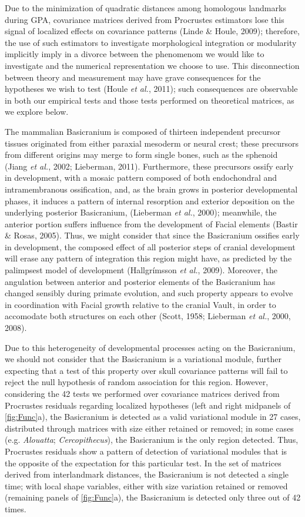 \documentclass[12pt,twoside]{report}
\begin{document}
Due to the minimization of quadratic distances among homologous
landmarks during GPA, covariance matrices derived from Procrustes
estimators lose this signal of localized effects on covariance patterns
(Linde \& Houle, 2009); therefore, the use of such estimators to
investigate morphological integration or modularity implicitly imply in
a divorce between the phenomenom we would like to investigate and the
numerical representation we choose to use. This disconnection between
theory and measurement may have grave consequences for the hypotheses we
wish to test (Houle \emph{et al.}, 2011); such consequences are
observable in both our empirical tests and those tests performed on
theoretical matrices, as we explore below.

The mammalian Basicranium is composed of thirteen independent precursor
tissues originated from either paraxial mesoderm or neural crest; these
precursors from different origins may merge to form single bones, such
as the sphenoid (Jiang \emph{et al.}, 2002; Lieberman, 2011).
Furthermore, these precursors ossify early in development, with a mosaic
pattern composed of both endochondral and intramembranous ossification,
and, as the brain grows in posterior developmental phases, it induces a
pattern of internal resorption and exterior deposition on the underlying
posterior Basicranium, (Lieberman \emph{et al.}, 2000); meanwhile, the
anterior portion suffers influence from the development of Facial
elements (Bastir \& Rosas, 2005). Thus, we might consider that since the
Basicranium ossifies early in development, the composed effect of all
posterior steps of cranial development will erase any pattern of
integration this region might have, as predicted by the palimpsest model
of development (Hallgrímsson \emph{et al.}, 2009). Moreover, the
angulation between anterior and posterior elements of the Basicranium
has changed sensibly during primate evolution, and such property appears
to evolve in coordination with Facial growth relative to the cranial
Vault, in order to accomodate both structures on each other (Scott,
1958; Lieberman \emph{et al.}, 2000, 2008).

Due to this heterogeneity of developmental processes acting on the
Basicranium, we should not consider that the Basicranium is a
variational module, further expecting that a test of this property over
skull covariance patterns will fail to reject the null hypothesis of
random association for this region. However, considering the 42 tests we
performed over covariance matrices derived from Procrustes residuals
regarding localized hypotheses (left and right midpanels of
\autoref{fig:Func}a), the Basicranium is detected as a valid variational
module in 27 cases, distributed through matrices with size either
retained or removed; in some cases (e.g. \emph{Alouatta};
\emph{Cercopithecus}), the Basicranium is the only region detected.
Thus, Procrustes residuals show a pattern of detection of variational
modules that is the opposite of the expectation for this particular
test. In the set of matrices derived from interlandmark distances, the
Basicranium is not detected a single time; with local shape variables,
either with size variation retained or removed (remaining panels of
\autoref{fig:Func}a), the Basicranium is detected only three out of 42
times.
\end{document}
